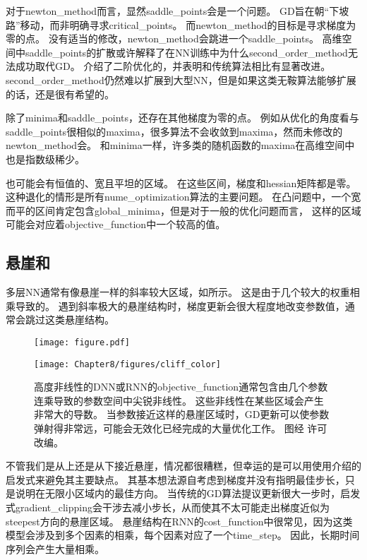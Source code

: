 对于\gls{newton_method}而言，显然\gls{saddle_points}会是一个问题。
\gls{GD}旨在朝``下坡路''移动，而非明确寻求\gls{critical_points}。
而\gls{newton_method}的目标是寻求梯度为零的点。
没有适当的修改，\gls{newton_method}会跳进一个\gls{saddle_points}。
高维空间中\gls{saddle_points}的扩散或许解释了在\gls{NN}训练中为什么\gls{second_order_method}无法成功取代\gls{GD}。
\cite{Dauphin-et-al-NIPS2014-small}介绍了二阶优化的，并表明和传统算法相比有显著改进。
\gls{second_order_method}仍然难以扩展到大型\gls{NN}，但是如果这类无鞍算法能够扩展的话，还是很有希望的。


除了\gls{minima}和\gls{saddle_points}，还存在其他梯度为零的点。
例如从优化的角度看与\gls{saddle_points}很相似的\gls{maxima}，很多算法不会收敛到\gls{maxima}，然而未修改的\gls{newton_method}会。
和\gls{minima}一样，许多类的随机函数的\gls{maxima}在高维空间中也是指数级稀少。


也可能会有恒值的、宽且平坦的区域。
在这些区间，梯度和\gls{hessian}矩阵都是零。
这种退化的情形是所有\gls{nume_optimization}算法的主要问题。
在凸问题中，一个宽而平的区间肯定包含\gls{global_minima}，但是对于一般的优化问题而言，
这样的区域可能会对应着\gls{objective_function}中一个较高的值。


\subsection{悬崖和}
\label{sec:cliffs_and_exploding_gradients}
多层\gls{NN}通常有像悬崖一样的斜率较大区域，如所示。
这是由于几个较大的权重相乘导致的。
遇到斜率极大的悬崖结构时，梯度更新会很大程度地改变参数值，通常会跳过这类悬崖结构。


\begin{figure}[!htb]
\ifOpenSource
\centerline{\texttt{[image: figure.pdf]}}
\else
\centerline{\texttt{[image: Chapter8/figures/cliff\_color]}}
\fi
\caption{高度非线性的\gls{DNN}或\gls{RNN}的\gls{objective_function}通常包含由几个参数连乘导致的参数空间中尖锐非线性。
这些非线性在某些区域会产生非常大的导数。
当参数接近这样的悬崖区域时，\gls{GD}更新可以使参数弹射得非常远，可能会无效化已经完成的大量优化工作。
图经 \citet{Pascanu+al-ICML2013-small}许可改编。}
\label{fig:chap8_cliff}
\end{figure}


不管我们是从上还是从下接近悬崖，情况都很糟糕，但幸运的是可以用使用介绍的启发式来避免其主要缺点。
其基本想法源自考虑到梯度并没有指明最佳步长，只是说明在无限小区域内的最佳方向。
当传统的\gls{GD}算法提议更新很大一步时，启发式\gls{gradient_clipping}会干涉去减小步长，从而使其不太可能走出梯度近似为\gls{steepest}方向的悬崖区域。
悬崖结构在\gls{RNN}的\gls{cost_function}中很常见，因为这类模型会涉及到多个因素的相乘，每个因素对应了一个\gls{time_step}。
因此，长期时间序列会产生大量相乘。


